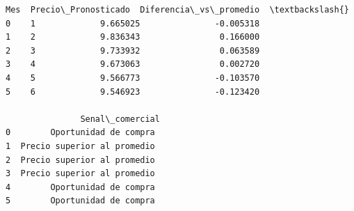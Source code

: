 \documentclass[11pt]{article}
\makeatletter
\newcommand{\boxspacing}{\kern\kvtcb@left@rule\kern\kvtcb@boxsep}
\newcommand{\prompt}[4]{
        {\ttfamily\llap{{\color{#2}[#3]:\hspace{3pt}#4}}\vspace{-\baselineskip}}
    }
\makeatother
\begin{document}
            \begin{tcolorbox}[breakable, size=fbox, boxrule=.5pt, pad at break*=1mm, opacityfill=0]
\prompt{Out}{outcolor}{318}{\boxspacing}
\begin{Verbatim}[commandchars=\\\{\}]
   Mes  Precio\_Pronosticado  Diferencia\_vs\_promedio  \textbackslash{}
0    1             9.665025               -0.005318
1    2             9.836343                0.166000
2    3             9.733932                0.063589
3    4             9.673063                0.002720
4    5             9.566773               -0.103570
5    6             9.546923               -0.123420

               Senal\_comercial
0        Oportunidad de compra
1  Precio superior al promedio
2  Precio superior al promedio
3  Precio superior al promedio
4        Oportunidad de compra
5        Oportunidad de compra
\end{Verbatim}
\end{tcolorbox}
        
\end{document}
